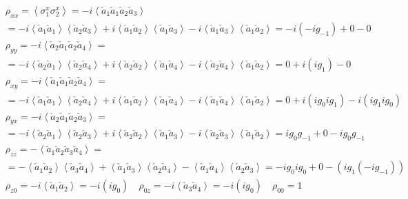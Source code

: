 \documentclass[12pt,a4paper]{book}
\theoremstyle{definition}
\begin{document}
\begin{equation}\label{eq:wickcalc}
	\begin{aligned}
		&\rho_{xx}=\left\langle\sigma_{1}^{x} \sigma_{2}^{x}\right\rangle=
		-i\left\langle\check{a}_1\check{a}_1\check{a}_2\check{a}_3\right\rangle \\ &=-i\left\langle\check{a}_1\check{a}_1\right\rangle\left\langle\check{a}_2\check{a}_3\right\rangle+ i\left\langle\check{a}_1\check{a}_2\right\rangle\left\langle\check{a}_1\check{a}_3\right\rangle
		-i\left\langle\check{a}_1\check{a}_3\right\rangle\left\langle\check{a}_1\check{a}_2\right\rangle=-i(-ig_{-1})+0-0 \\ 		
		&\rho_{yy}=-i\left\langle\check{a}_2\check{a}_1\check{a}_2\check{a}_4\right\rangle=\\&=-i\left\langle\check{a}_2\check{a}_1\right\rangle\left\langle\check{a}_2\check{a}_4\right\rangle+i\left\langle\check{a}_2\check{a}_2\right\rangle\left\langle\check{a}_1\check{a}_4\right\rangle-i\left\langle\check{a}_2\check{a}_4\right\rangle\left\langle\check{a}_1\check{a}_2\right\rangle=0+i(ig_1)-0 \\ 	
		&\rho_{xy}=-i\left\langle\check{a}_1\check{a}_1\check{a}_2\check{a}_4\right\rangle=\\&=-i\left\langle\check{a}_1\check{a}_1\right\rangle\left\langle\check{a}_2\check{a}_4\right\rangle+i\left\langle\check{a}_1\check{a}_2\right\rangle\left\langle\check{a}_1\check{a}_4\right\rangle-i\left\langle\check{a}_1\check{a}_4\right\rangle\left\langle\check{a}_1\check{a}_2\right\rangle=0+i(ig_0ig_1)-i(ig_1ig_0) \\ 
		&\rho_{yx}=-i\left\langle\check{a}_2\check{a}_1\check{a}_2\check{a}_3\right\rangle=\\&=-i\left\langle\check{a}_2\check{a}_1\right\rangle\left\langle\check{a}_2\check{a}_3\right\rangle+ i\left\langle\check{a}_2\check{a}_2\right\rangle\left\langle\check{a}_1\check{a}_3\right\rangle
		-i\left\langle\check{a}_2\check{a}_3\right\rangle\left\langle\check{a}_1\check{a}_2\right\rangle=ig_0g_{-1}+0-ig_0g_{-1} \\ 
		&\rho_{zz}=-\left\langle\check{a}_1\check{a}_2\check{a}_3\check{a}_4\right\rangle=\\&=-\left\langle\check{a}_1\check{a}_2\right\rangle\left\langle\check{a}_3\check{a}_4\right\rangle+\left\langle\check{a}_1\check{a}_3\right\rangle\left\langle\check{a}_2\check{a}_4\right\rangle-\left\langle\check{a}_1\check{a}_4\right\rangle\left\langle\check{a}_2\check{a}_3\right\rangle=-ig_0ig_{0}+0-(ig_1(-ig_{-1})) \\ 
		&\rho_{z0}=-i\left\langle\check{a}_1\check{a}_2\right\rangle=-i(ig_0) \quad  \rho_{0z}=-i\left\langle\check{a}_3\check{a}_4\right\rangle=-i(ig_{0})	 \quad		\rho_{00}=1 \\
	\end{aligned}	
\end{equation}
\end{document}
